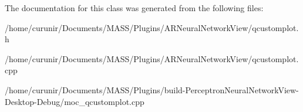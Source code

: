 The documentation for this class was generated from the following files\+:\begin{DoxyCompactItemize}
\item 
/home/curunir/\+Documents/\+M\+A\+S\+S/\+Plugins/\+A\+R\+Neural\+Network\+View/qcustomplot.\+h\item 
/home/curunir/\+Documents/\+M\+A\+S\+S/\+Plugins/\+A\+R\+Neural\+Network\+View/qcustomplot.\+cpp\item 
/home/curunir/\+Documents/\+M\+A\+S\+S/\+Plugins/build-\/\+Perceptron\+Neural\+Network\+View-\/\+Desktop-\/\+Debug/moc\+\_\+qcustomplot.\+cpp\end{DoxyCompactItemize}
